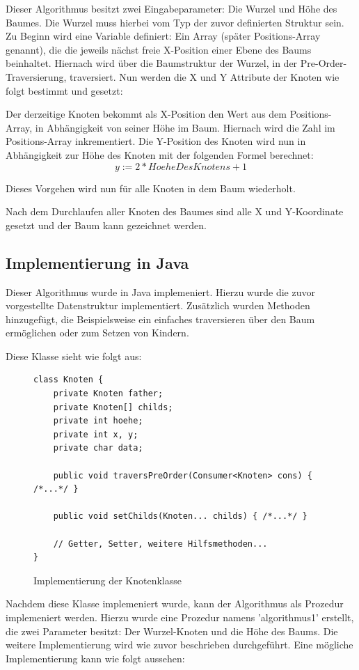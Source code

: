 Dieser Algorithmus besitzt zwei Eingabeparameter: Die Wurzel und Höhe des Baumes.
Die Wurzel muss hierbei vom Typ der zuvor definierten Struktur sein. Zu Beginn wird eine Variable definiert:
Ein Array (später Positions-Array genannt), die die jeweils nächst freie X-Position einer Ebene des Baums beinhaltet.
Hiernach wird über die Baumstruktur der Wurzel, in der Pre-Order-Traversierung, traversiert.
Nun werden die X und Y Attribute der Knoten wie folgt bestimmt und gesetzt:

Der derzeitige Knoten bekommt als X-Position den Wert aus dem Positions-Array, in Abhängigkeit von seiner Höhe im Baum.
Hiernach wird die Zahl im Positions-Array inkrementiert. Die Y-Position des Knoten wird nun in Abhängigkeit zur Höhe des Knoten
mit der folgenden Formel berechnet: $$y := 2 * HoeheDesKnotens + 1$$

Dieses Vorgehen wird nun für alle Knoten in dem Baum wiederholt. 

Nach dem Durchlaufen aller Knoten des Baumes sind alle X und Y-Koordinate gesetzt und der Baum kann gezeichnet werden.

\subsection{Implementierung in Java}
Dieser Algorithmus wurde in Java implemeniert. Hierzu wurde die zuvor vorgestellte Datenstruktur
implementiert. Zusätzlich wurden Methoden hinzugefügt, die Beispielsweise
ein einfaches traversieren über den Baum ermöglichen oder zum Setzen von Kindern.

Diese Klasse sieht wie folgt aus:

\begin{figure}
\begin{lstlisting}
class Knoten {
	private Knoten father;
	private Knoten[] childs;
	private int hoehe;
	private int x, y;
	private char data;

	public void traversPreOrder(Consumer<Knoten> cons) { /*...*/ }

	public void setChilds(Knoten... childs) { /*...*/ }

	// Getter, Setter, weitere Hilfsmethoden...
}
\end{lstlisting}
\caption{Implementierung der Knotenklasse}
\label{code:knotenclass}
\end{figure}

Nachdem diese Klasse implemeniert wurde, kann der Algorithmus als Prozedur implemeniert werden.
Hierzu wurde eine Prozedur namens 'algorithmus1' erstellt, die zwei Parameter besitzt: Der Wurzel-Knoten
und die Höhe des Baums. Die weitere Implementierung wird wie zuvor beschrieben durchgeführt. Eine mögliche Implementierung
kann wie folgt aussehen:

